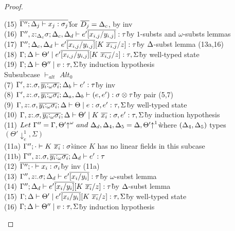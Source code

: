 \documentclass[acmsmall,review,anonymous,screen]{acmart}
\begin{document}
\begin{proof}
\begin{description}
\begin{tabbing}
    (15) $\overline{\Gamma''; \Delta_j \vdash x_j : \sigma_j}$\` for $\overline{D_j}=\Delta_c$, by inv\\
    (16) $\Gamma'', z{:}_{\Delta_c}\sigma; \Delta_c, \Delta_d \vdash e'\overline{[x_{i,j}/y_{i,j}]} : \tau$\`by $1$-substs and $\omega$-substs lemmas\\
    (17) $\Gamma''; \Delta_c, \Delta_d \vdash e'\overline{[x_{i,j}/y_{i,j}]}[K~\overline{x_{i,j}}/z] : \tau$\`by $\Delta$-subst lemma (13a,16)\\
    (18) $\Gamma; \Delta \vdash \Theta' \mid e'\overline{[x_{i,j}/y_{i,j}]}[K~\overline{x_{i,j}}/z] : \tau, \Sigma$\`by well-typed state\\
    (19) $\Gamma; \Delta \vdash \Theta'' \mid v : \tau, \Sigma$\`by induction hypothesis\\
    Subsubcase $\vdash_{alt}$ $Alt_0$\\
    (7) $\Gamma', z{:}_\cdot\sigma, \overline{y_i{:}_\omega\sigma_i}; \Delta_b \vdash e' : \tau$\` by inv\\
    (8) $\Gamma', z{:}_\cdot\sigma, \overline{y_i{:}_\omega\sigma_i}; \Delta_a, \Delta_b \vdash (e, e') : \sigma \otimes \tau$\` by pair (5,7)\\
    (9) $\Gamma, z{:}_\cdot\sigma, \overline{y_i{:}_\omega\sigma_i}; \Delta \vdash \Theta \mid e : \sigma, e' : \tau, \Sigma$\` by well-typed state\\
    (10) $\Gamma, z{:}_\cdot\sigma, \overline{y_i{:}_\omega\sigma_i}; \Delta \vdash \Theta' \mid K~\overline{x_i} : \sigma, e' : \tau, \Sigma$\` by induction hypothesis\\
    (11) $Let~\Gamma'' = \Gamma,\Theta'{\uparrow}^\omega~and~\Delta_d,\Delta_4,\Delta_5 = \Delta, \Theta'{\uparrow}^1$\` where $(\Delta_4, \Delta_5)$ types $(\Theta'{\downarrow^1_e}, \Sigma)$\\
    (11a) $\Gamma''; \cdot \vdash K~\overline{x_i} : \sigma$\`since $K$ has no linear fields in this subcase\\
    (11b) $\Gamma'', z{:}_{\cdot}\sigma, \overline{y_i{:}_\omega\sigma_i}; \Delta_d \vdash e' : \tau$\\
    (12) $\overline{\Gamma''; \cdot \vdash x_{i} : \sigma_i}$\`by inv (11a)\\
    (13) $\Gamma'', z{:}_{\cdot}\sigma; \Delta_d \vdash e'\overline{[x_i/y_i]} : \tau$\` by $\omega$-subst lemma\\
    (14) $\Gamma''; \Delta_d \vdash e'\overline{[x_i/y_i]}[K~\overline{x_i}/z] : \tau$\` by $\Delta$-subst lemma\\
    (15) $\Gamma; \Delta \vdash \Theta' \mid e'\overline{[x_i/y_i]}[K~\overline{x_i}/z] :
    \tau, \Sigma$\` by well-typed state\\
    (16) $\Gamma; \Delta \vdash \Theta'' \mid v : \tau, \Sigma$\` by induction hypothesis\\

\end{tabbing}
\end{description}
\end{proof}
\end{document}
